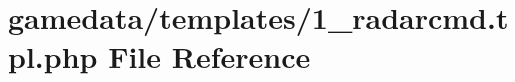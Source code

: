 \hypertarget{1__radarcmd_8tpl_8php}{\section{gamedata/templates/1\+\_\+radarcmd.tpl.\+php File Reference}
\label{1__radarcmd_8tpl_8php}
}
